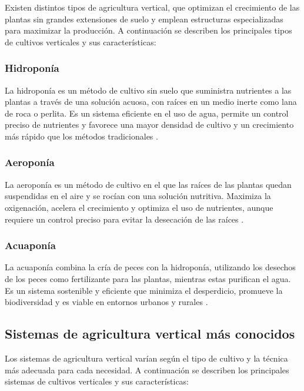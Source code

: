 
Existen distintos tipos de agricultura vertical, que optimizan el crecimiento de las plantas sin grandes extensiones de suelo y emplean estructuras especializadas para maximizar la producción.
A continuación se describen los principales tipos de cultivos verticales y sus características:

\subsubsection{Hidroponía}
La hidroponía es un método de cultivo sin suelo que suministra nutrientes a las plantas a través de una solución acuosa, con raíces en un medio inerte como lana de roca o perlita. Es un sistema eficiente en el uso de agua, permite un control preciso de nutrientes y favorece una mayor densidad de cultivo y un crecimiento más rápido que los métodos tradicionales \cite{SANTANDER} \cite{CULTIVOS:TIPOS}.
\subsubsection{Aeroponía}
La aeroponía es un método de cultivo en el que las raíces de las plantas quedan suspendidas en el aire y se rocían con una solución nutritiva. Maximiza la oxigenación, acelera el crecimiento y optimiza el uso de nutrientes, aunque requiere un control preciso para evitar la desecación de las raíces \cite{SANTANDER} \cite{CULTIVOS:TIPOS}.
\subsubsection{Acuaponía}
La acuaponía combina la cría de peces con la hidroponía, utilizando los desechos de los peces como fertilizante para las plantas, mientras estas purifican el agua. Es un sistema sostenible y eficiente que minimiza el desperdicio, promueve la biodiversidad y es viable en entornos urbanos y rurales \cite{CULTIVOS:TIPOS}.


\subsection{Sistemas de agricultura vertical más conocidos}
Los sistemas de agricultura vertical varían según el tipo de cultivo y la técnica más adecuada para cada necesidad.
A continuación se describen los principales sistemas de cultivos verticales y sus características:

